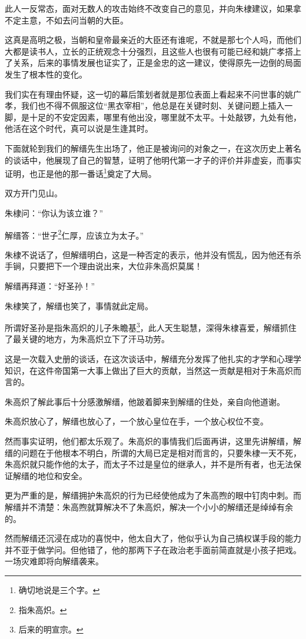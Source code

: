 \begin{multicols}{\theparacolNo}
此人一反常态，面对无数人的攻击始终不改变自己的意见，并向朱棣建议，如果拿不定主意，不如去问当朝的大臣。

这真是高明之极，当朝和皇帝最亲近的大臣还有谁呢，不就是那七个人吗，而他们大都是读书人，立长的正统观念十分强烈，且这些人也很有可能已经和姚广孝搭上了关系，后来的事情发展也证实了，正是金忠的这一建议，使得原先一边倒的局面发生了根本性的变化。

我们实在有理由怀疑，这一切的幕后策划者就是那位表面上看起来不问世事的姚广孝，我们也不得不佩服这位“黑衣宰相”，他总是在关键时刻、关键问题上插入一脚，是十足的不安定因素，哪里有他出没，哪里就不太平。十处敲锣，九处有他，他活在这个时代，真可以说是生逢其时。

下面就轮到我们的解缙先生出场了，他正是被询问的对象之一，在这次历史上著名的谈话中，他展现了自己的智慧，证明了他明代第一才子的评价并非虚妄，而事实证明，也正是他的那一番话\footnote{确切地说是三个字。}奠定了大局。

双方开门见山。

朱棣问：“你认为该立谁？”

解缙答：“世子\footnote{指朱高炽。}仁厚，应该立为太子。”

朱棣不说话了，但解缙明白，这是一种否定的表示，他并没有慌乱，因为他还有杀手锏，只要把下一个理由说出来，大位非朱高炽莫属！

解缙再拜道：“好圣孙！”

朱棣笑了，解缙也笑了，事情就此定局。

所谓好圣孙是指朱高炽的儿子朱瞻基\footnote{后来的明宣宗。}，此人天生聪慧，深得朱棣喜爱，解缙抓住了最关键的地方，为朱高炽立下了汗马功劳。

这是一次载入史册的谈话，在这次谈话中，解缙充分发挥了他扎实的才学和心理学知识，在这件帝国第一大事上做出了巨大的贡献，当然这一贡献是相对于朱高炽而言的。

朱高炽了解此事后十分感激解缙，他跛着脚来到解缙的住处，亲自向他道谢。

朱高炽放心了，解缙也放心了，一个放心皇位在手，一个放心权位不变。

然而事实证明，他们都太乐观了。朱高炽的事情我们后面再讲，这里先讲解缙，解缙的问题在于他根本不明白，所谓的大局已定是相对而言的，只要朱棣一天不死，朱高炽就只能作他的太子，而太子不过是皇位的继承人，并不是所有者，也无法保证解缙的地位和安全。

更为严重的是，解缙拥护朱高炽的行为已经使他成为了朱高煦的眼中钉肉中刺。而解缙并不清楚：朱高煦就算解决不了朱高炽，解决一个小小的解缙还是绰绰有余的。

然而解缙还沉浸在成功的喜悦中，他太自大了，他似乎认为自己搞权谋手段的能力并不亚于做学问。但他错了，他的那两下子在政治老手面前简直就是小孩子把戏。一场灾难即将向解缙袭来。


\end{multicols}
